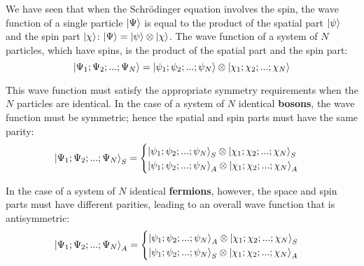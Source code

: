 We have seen that when the Schrödinger equation involves the spin, the wave function of a single particle $\ket{\Psi}$ is equal to the product of the spatial part $\ket{\psi}$ and the spin part $\ket{\chi}$: $\ket{\Psi} = \ket{\psi}\otimes\ket{\chi}$. The wave function of a system of $N$ particles, which have spins, is the product of the spatial part and the spin part:
\begin{equation}
    \ket{\Psi_1;\Psi_2;...;\Psi_N} = \ket{\psi_1;\psi_2;...;\psi_N}\otimes \ket{\chi_1;\chi_2;...;\chi_N}
\end{equation}

This wave function must satisfy the appropriate symmetry requirements when the $N$ particles are identical. In the case of a system of $N$ identical \textbf{bosons}, the wave function must be symmetric; hence the spatial and spin parts must have the same parity:
\begin{equation}
    \ket{\Psi_1;\Psi_2;...;\Psi_N}_S = \begin{cases}
        \ket{\psi_1;\psi_2;...;\psi_N}_S\otimes \ket{\chi_1;\chi_2;...;\chi_N}_S\\
        \ket{\psi_1;\psi_2;...;\psi_N}_A\otimes \ket{\chi_1;\chi_2;...;\chi_N}_A\\
    \end{cases}
\end{equation}

In the case of a system of $N$ identical \textbf{fermions}, however, the space and spin parts must have different parities, leading to an overall wave function that is antisymmetric:
\begin{equation}
    \ket{\Psi_1;\Psi_2;...;\Psi_N}_A = \begin{cases}
        \ket{\psi_1;\psi_2;...;\psi_N}_A\otimes \ket{\chi_1;\chi_2;...;\chi_N}_S\\
        \ket{\psi_1;\psi_2;...;\psi_N}_S\otimes \ket{\chi_1;\chi_2;...;\chi_N}_A\\
    \end{cases}
\end{equation}
